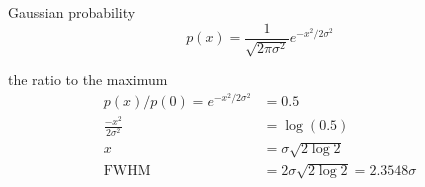 Gaussian probability
$$ p(x) = \frac{1}{\sqrt{2\pi \sigma^2}} e^{-x^2/2\sigma^2} $$

the ratio to the maximum
\begin{align*}
p(x)/p(0) = e^{-x^2/2\sigma^2} &= 0.5 \\
            \frac{-x^2}{2\sigma^2}   &= \log(0.5) \\
            x &= \sigma \sqrt{2\log{2}} \\
            \text{FWHM} &= 2\sigma \sqrt{2\log{2}} = 2.3548\sigma
\end{align*}
